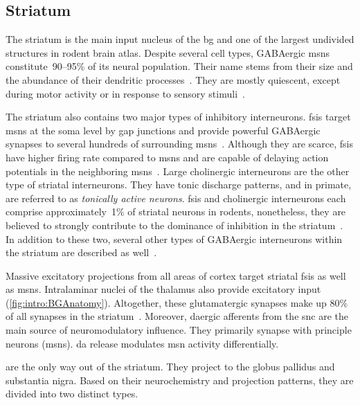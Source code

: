 \subsection{Striatum} \label{intro:anatomy:striatum}
The striatum is the main input nucleus of the \gls{bg} and one of the largest undivided structures in rodent brain atlas.
Despite several cell types, GABAergic \glspl{msn} constitute~90--95\% of its neural population.
Their name stems from their size and the abundance of their dendritic processes~\cite{TURNER2000BasalFunction}.
They are mostly quiescent, except during  motor activity or in response to sensory stimuli~\cite{KandelBook2001}.
\par
The striatum also contains two major types of inhibitory interneurons.
\Glspl{fsi} target \glspl{msn} at the soma level by gap junctions and provide powerful GABAergic synapses to several hundreds of surrounding \glspl{msn}~\cite{Grillner2016BG, Gage2010FSI}.
Although they are scarce, \glspl{fsi} have higher firing rate compared to \glspl{msn} and are capable of delaying action potentials in the neighboring \glspl{msn}~\cite{Wilson2007GABAergicNeostriatum}.
Large cholinergic interneurons are the other type of striatal interneurons.
They have tonic discharge patterns, and in primate, are referred to as \textit{tonically active neurons}.
\Glspl{fsi} and cholinergic interneurons each comprise approximately~1\% of striatal neurons in rodents, nonetheless, they are believed to strongly contribute to the dominance of inhibition in the striatum~\cite{Gage2010FSI}.
In addition to these two, several other types of GABAergic interneurons within the striatum are described as well~\cite{Grillner2016BG}.
\par
Massive excitatory projections from all areas of cortex target striatal \glspl{fsi} as well as \glspl{msn}.
Intralaminar nuclei of the thalamus also provide excitatory input (\autoref{fig:intro:BGAnatomy}).
Altogether, these glutamatergic synapses make up 80\% of all synapses in the striatum~\cite{Wilson2007GABAergicNeostriatum}.
Moreover, \gls{da}ergic afferents from the \gls{snc} are the main source of neuromodulatory influence.
They primarily synapse with principle neurons (\glspl{msn}).
\Gls{da} release modulates \gls{msn} activity differentially.
\par
{} are the only way out of the striatum.
They project to the globus pallidus and substantia nigra.
Based on their neurochemistry and projection patterns, they are divided into two distinct types.
